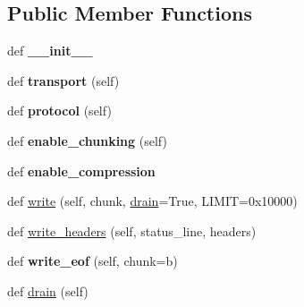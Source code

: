\subsection*{Public Member Functions}
\begin{DoxyCompactItemize}
\item 
\mbox{\label{classaiohttp_1_1http__writer_1_1_stream_writer_a8ca0bb03d80e4a85517c706ea0f44be1}} 
def {\bfseries \+\_\+\+\_\+init\+\_\+\+\_\+}
\item 
\mbox{\label{classaiohttp_1_1http__writer_1_1_stream_writer_a5700b1f8fad98a1e624a05d7fd3e15c5}} 
def {\bfseries transport} (self)
\item 
\mbox{\label{classaiohttp_1_1http__writer_1_1_stream_writer_a913eeb8d77e926f4f62f9bfc8f36c291}} 
def {\bfseries protocol} (self)
\item 
\mbox{\label{classaiohttp_1_1http__writer_1_1_stream_writer_ac9f1d41abd833543dc883786a639aaa8}} 
def {\bfseries enable\+\_\+chunking} (self)
\item 
\mbox{\label{classaiohttp_1_1http__writer_1_1_stream_writer_a2571ebb9a4868e29720f41f24083ab0d}} 
def {\bfseries enable\+\_\+compression}
\item 
def \hyperlink{classaiohttp_1_1http__writer_1_1_stream_writer_a25f7d4ab3ecc49c6de1c57a2adc9502f}{write} (self, chunk, \hyperlink{classaiohttp_1_1http__writer_1_1_stream_writer_a5db49131b819dbe234ea180010417b05}{drain}=True, L\+I\+M\+IT=0x10000)
\item 
def \hyperlink{classaiohttp_1_1http__writer_1_1_stream_writer_abbb79b9abf414dc7ce352766920ab868}{write\+\_\+headers} (self, status\+\_\+line, headers)
\item 
\mbox{\label{classaiohttp_1_1http__writer_1_1_stream_writer_af573e959c54f83c8c4d5cdc9b94bc453}} 
def {\bfseries write\+\_\+eof} (self, chunk=b\textquotesingle{}\textquotesingle{})
\item 
def \hyperlink{classaiohttp_1_1http__writer_1_1_stream_writer_a5db49131b819dbe234ea180010417b05}{drain} (self)
\end{DoxyCompactItemize}
